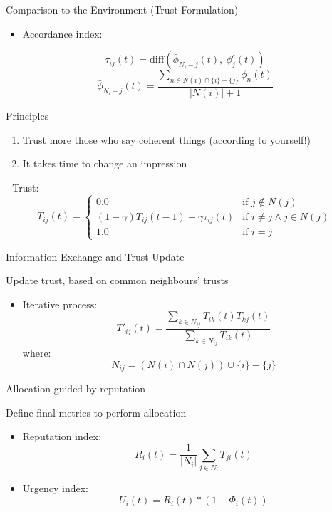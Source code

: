\begin{frame}{Comparison to the Environment (Trust Formulation)}

\columnsbegin
{}

\begin{itemize}
\tightlist
\item
  Accordance index:
\end{itemize}

\[\tau_{ij}(t) = \text{diff}(\bar\phi_{N_{i}-j}(t), ~\phi^{c}_j(t))\]
\[\bar\phi_{N_i-j}(t) = \frac{\sum_{n \in N(i) \cap \{i\} - \{j\}} \phi_n(t)}{|N(i)|+1} \]


\begin{block}{Principles}
  \begin{enumerate}
  \item Trust more those who say coherent things (according to yourself!)
  \item It takes time to change an impression
  \end{enumerate}
\end{block}

\columnsend
- Trust: \[
T_{ij}(t) =
 \begin{cases}
 0.0   & \text{if }j \notin N(j)\\
 (1 - \gamma)  T_{ij} \left ( t-1 \right ) +  \gamma  \tau_{ij}(t) & \text{if } i \neq j \land j \in N(j)\\
 1.0  & \text{if } i = j
 \end{cases}
 \]

\end{frame}

\begin{frame}{Information Exchange and Trust Update}

\begin{block}{}
Update trust, based on common neighbours' trusts
\end{block}

\begin{itemize}
\tightlist
\item
  Iterative process: \[
  T'_{ij}(t) = \frac{\sum_{k \in N_{ij}} T_{ik}(t) T_{kj}(t)}{\sum_{k \in N_{ij}} T_{ik}(t)}
  \label{propagation}
  \] where:
  \[N_{ij} = \left ( N(i) \cap N(j) \right ) \cup \{i\} - \{j\}\]
\end{itemize}

\end{frame}

\begin{frame}{Allocation guided by reputation}

\begin{block}{}
Define final metrics to perform allocation
\end{block}

\begin{itemize}
\item
  Reputation index:
  \[ R_i(t) = \frac{1}{|N_{i}|} \sum_{j \in N_{i}} T_{ji}(t) \]
\item
  Urgency index: \[ U_i(t) = R_i(t) * (1-\Phi_i(t)) \]
\end{itemize}

\end{frame}

